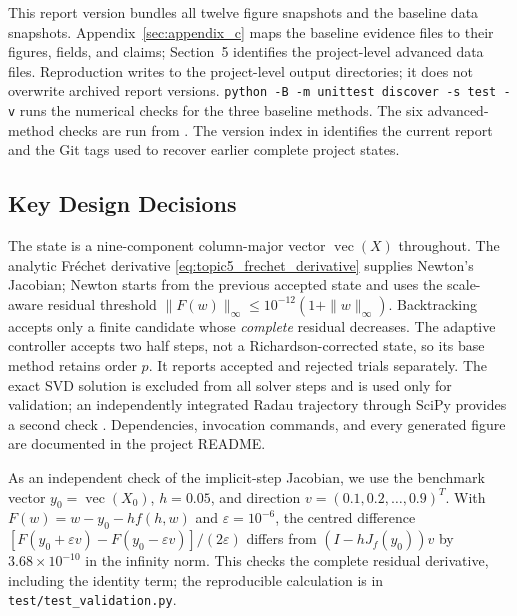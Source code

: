 This report version bundles all twelve figure snapshots and the baseline
data snapshots. Appendix~\ref{sec:appendix_c} maps the baseline evidence
files to their figures, fields, and claims; Section~5 identifies the
project-level advanced data files. Reproduction writes to the project-level
output directories; it does not overwrite archived report versions.
\texttt{python -B -m unittest discover -s test -v} runs the numerical
checks for the three baseline methods. The six advanced-method checks
are run from . The version index in
 identifies the current report and
the Git tags used to recover earlier complete project states.

\subsection{Key Design Decisions}
The state is a nine-component column-major vector
$\operatorname{vec}(X)$ throughout. The analytic Fr\'echet derivative
\eqref{eq:topic5_frechet_derivative} supplies Newton's Jacobian;
Newton starts from the previous accepted state and uses the
scale-aware residual threshold
$\|F(w)\|_\infty\leq10^{-12}(1+\|w\|_\infty)$.
Backtracking accepts only a finite candidate whose \emph{complete}
residual decreases. The adaptive controller accepts two half steps,
not a Richardson-corrected state, so its base method retains order
$p$. It reports accepted and rejected trials separately. The exact
SVD solution is excluded from all solver steps and is used only for
validation; an independently integrated Radau trajectory through
SciPy provides a second check \cite{virtanen2020}. Dependencies, invocation
commands, and every generated figure are documented in the project README.

As an independent check of the implicit-step Jacobian, we use the
benchmark vector $y_0=\operatorname{vec}(X_0)$, $h=0.05$, and direction
$v=(0.1,0.2,\ldots,0.9)^T$. With
$F(w)=w-y_0-hf(h,w)$ and $\varepsilon=10^{-6}$, the centred difference
$[F(y_0+\varepsilon v)-F(y_0-\varepsilon v)]/(2\varepsilon)$ differs
from $(I-hJ_f(y_0))v$ by $3.68\times10^{-10}$ in the infinity norm.
This checks the complete residual derivative, including the identity
term; the reproducible calculation is in
\texttt{test/test\_validation.py}.

\newpage
